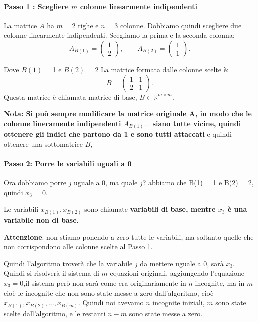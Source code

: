 \paragraph{Passo 1 : Scegliere \(m\) colonne linearmente indipendenti}
La matrice \(A\) ha \(m=2\) righe e \(n=3\) colonne. Dobbiamo quindi scegliere due colonne linearmente indipendenti.
Scegliamo la prima e la seconda colonna:
\[
A_{B(1)}=\begin{pmatrix}1\\2\end{pmatrix},
\qquad
A_{B(2)}=\begin{pmatrix}1\\1\end{pmatrix}.
\]

Dove $B(1)$ = 1 e $B(2)$ = 2
La matrice formata dalle colonne scelte è:
\[
B=\begin{pmatrix}
1&1\\
2&1
\end{pmatrix}.
\]
Questa matrice è chiamata matrice di base, $B \in \mathbb{R}^{m \times m}$.


\textbf{Nota: Si può sempre modificare la matrice originale A, in modo che le colonne lineramente indipendenti $A_{B(1)}...$ siano tutte vicine, quindi ottenere gli indici che partono da 1 e sono tutti attaccati} e quindi ottenere una sottomatrice $B$,

\paragraph{Passo 2: Porre le variabili uguali a 0}
Ora dobbiamo porre $j$ uguale a 0, ma quale $j$?
abbiamo che B(1) = 1 e B(2) = 2, quindi $x_3$ = 0.

Le variabili $x_{B(1)},x_{B(2)}$ sono chiamate \textbf{variabili di base, mentre $x_3$ è una variabile non di base}.


\textbf{Attenzione}: non stiamo ponendo a zero tutte le variabili, ma soltanto quelle che non corrispondono alle colonne scelte al Passo 1.

Quindi l'algoritmo troverà che la variabile $j$ da mettere uguale a 0, sarà $x_3$.
Quindi si risolverà il sistema di $m$ equazioni originali, aggiungendo l'equazione $x_3 = 0$,il sistema però non sarà come era originariamente in $n$ incognite, ma in $m$ cioè le incognite che non sono state messe a zero dall'algoritmo, cioè $x_{B(1)},x_{B(2)},\dots,x_{B(m)}$.
Quindi noi avevamo $n$ incognite iniziali, $m$ sono state scelte dall'algoritmo, e le restanti $n - m$ sono state messe a zero.

